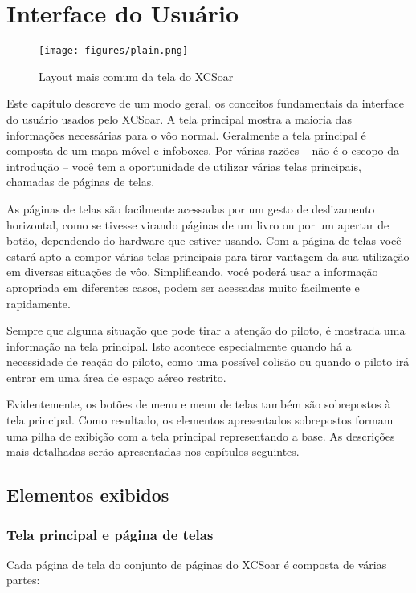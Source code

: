 \chapter{Interface do Usuário}\label{cha:interface}
\begin{figure}[h]
\texttt{[image: figures/plain.png]}
\caption{Layout mais comum da tela do XCSoar}
\end{figure}

Este capítulo descreve de um modo geral, os conceitos fundamentais da interface do usuário usados pelo XCSoar.  A tela principal mostra a maioria das informações necessárias para o vôo normal.   Geralmente a tela principal é composta de um mapa móvel e infoboxes.  Por várias razões – não é o escopo da introdução – você tem a oportunidade de utilizar várias telas principais, chamadas de páginas de telas.

As páginas de telas são facilmente acessadas por um gesto de deslizamento horizontal, como se tivesse virando páginas de um livro ou por um apertar de botão, dependendo do hardware que estiver usando.  Com a página de telas você estará apto a compor várias telas principais para tirar vantagem da sua utilização em diversas situações de vôo.  Simplificando, você poderá usar a informação apropriada em diferentes casos, podem ser acessadas muito facilmente e rapidamente.

Sempre que alguma situação que pode tirar a atenção do piloto, é mostrada uma informação na tela principal.  Isto acontece especialmente quando há a necessidade de reação do piloto, como uma possível colisão ou quando o piloto irá entrar em uma área de espaço aéreo restrito.

Evidentemente, os botões de menu e menu de telas também são sobrepostos à tela principal.  Como resultado, os elementos apresentados sobrepostos formam uma pilha de exibição com a tela principal representando a base.  As descrições mais detalhadas serão apresentadas nos capítulos seguintes. 


\section{Elementos exibidos}
\subsection*{Tela principal e página de telas}
Cada página de tela do conjunto de páginas do XCSoar é composta de várias partes:


